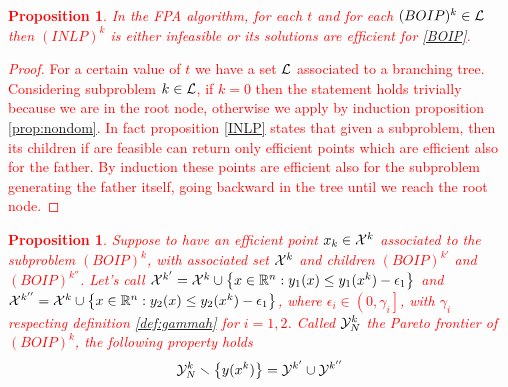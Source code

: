\documentclass[preprint,12pt]{elsarticle}
\newcommand{\red}[1]{\textcolor{red}{#1}}
\newtheorem{proposition}[theorem]{Proposition}
\def\setRn{\mathbb{R}^n}
\def\eps{\epsilon}
\begin{document}
\red{
\begin{proposition}\label{prop:frontierasottoproblema}
 In the FPA algorithm, for each $t$ and for each $(BOIP)^k \in \cal L$ then $(INLP)^k$ is either infeasible or its solutions are efficient for \eqref{BOIP}.
\end{proposition}
\begin{proof}
For a certain value of $t$ we have a set $\cal L$ associated to a branching tree. Considering subproblem $k \in \cal L$, if $k=0$ then the statement holds trivially because we are in the root node, otherwise we apply by induction proposition \ref{prop:nondom}.  In fact proposition \ref{INLP} states that given a subproblem, then its children if are feasible can return only efficient points which are efficient also for the father. By induction these points are efficient also for the subproblem generating the father itself, going backward in the tree until we reach the root node.  
\end{proof}
}

\red{
\begin{proposition}\label{prop:properties}
Suppose to have an efficient point $x_k \in {\cal X}^k$ associated to the subproblem $(BOIP)^k$, with associated set ${\cal X}^k$ and children $(BOIP)^{k'}$ and $(BOIP)^{k''}$. Let's call ${\cal X}^{k'} = {\cal X}^k \cup \left\{ x \in \setRn : y_1 (x) \le y_1(x^k) - \eps_1 \right\} $ and  ${\cal X}^{k''} = {\cal X}^k \cup \left\{ x \in \setRn : y_2 (x) \le y_2(x^k) - \eps_1 \right\} $, where $\eps_i \in \left( 0, \gamma_i \right] $, with $\gamma_i$ respecting definition \ref{def:gammah} for $i = 1,2$. Called ${\cal Y}^k_N$ the Pareto frontier of $(BOIP)^k$, the following property holds
$$
 {\cal Y}^k_N \smallsetminus \left\{ y(x^k) \right\} = {\cal Y}^{k'} \cup {\cal Y}^{k''}
$$
\end{proposition}
}
\end{document}
